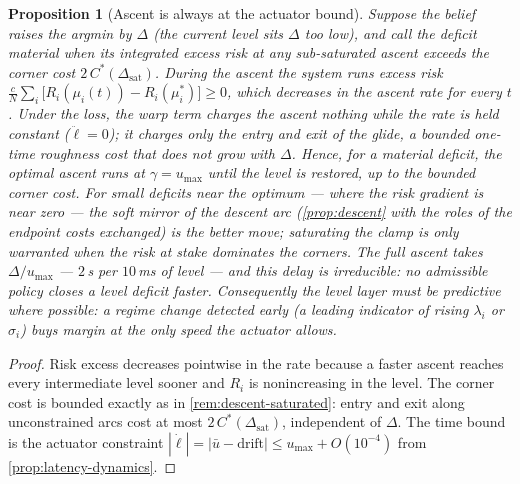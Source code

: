 \documentclass[11pt, a4paper]{article}
\theoremstyle{definition}
\theoremstyle{plain}
\newtheorem{proposition}[theorem]{Proposition}
\theoremstyle{remark}
\begin{document}
\begin{proposition}[Ascent is always at the actuator bound]
\label{prop:ascent}
Suppose the belief raises the argmin by $\Delta$ (the current level
sits $\Delta$ too low), and call the deficit \emph{material} when its
integrated excess risk at any sub-saturated ascent exceeds the corner
cost $2\,C^*(\Delta_{\mathrm{sat}})$.  During the ascent the system
runs excess risk
$\tfrac{c}{N}\sum_i\bigl[R_i(\mu_i(t)) - R_i(\mu_i^*)\bigr] \ge 0$,
which decreases in the ascent rate for every $t$.  Under the loss, the
warp term charges the ascent nothing while the rate is held constant
($\ddot\ell = 0$); it charges only the entry and exit of the glide, a
bounded one-time roughness cost that does not grow with $\Delta$.
Hence, for a material deficit, the optimal ascent runs at
$\gamma = u_{\max}$ until the level is restored, up to the bounded
corner cost.  For small deficits near the optimum --- where the risk
gradient is near zero --- the soft mirror of the descent arc
(\cref{prop:descent} with the roles of the endpoint costs exchanged)
is the better move; saturating the clamp is only warranted when the
risk at stake dominates the corners.  The full ascent takes $\Delta/u_{\max}$ --- $2$\,s per
$10$\,ms of level --- and this delay is irreducible: no admissible
policy closes a level deficit faster.  Consequently the level layer
must be \emph{predictive} where possible: a regime change detected
early (a leading indicator of rising $\lambda_i$ or $\sigma_i$) buys
margin at the only speed the actuator allows.
\end{proposition}

\begin{proof}
Risk excess decreases pointwise in the rate because a faster ascent
reaches every intermediate level sooner and $R_i$ is nonincreasing in
the level.  The corner cost is bounded exactly as in
\cref{rem:descent-saturated}: entry and exit along unconstrained arcs
cost at most $2\,C^*(\Delta_{\mathrm{sat}})$, independent of
$\Delta$.  The time bound is the actuator constraint
$|\dot\ell| = |\bar u - \text{drift}| \le u_{\max} + O(10^{-4})$ from
\cref{prop:latency-dynamics}.
\end{proof}
\end{document}
